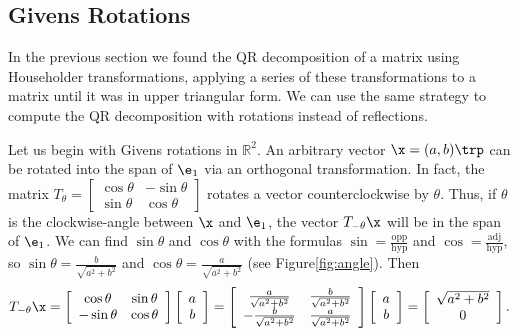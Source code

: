 \subsection*{Givens Rotations} %

In the previous section we found the QR decomposition of a matrix using Householder transformations, applying a series of these transformations to a matrix until it was in upper triangular form.
We can use the same strategy to compute the QR decomposition with rotations instead of reflections.

Let us begin with Givens rotations in $\mathbb{R}^2$.
An arbitrary vector $\x = (a, b)\trp$ can be rotated into the span of $\e_1$ via an orthogonal transformation.
In fact, the matrix $T_{\theta} = \left[\begin{array}{cc}\cos \theta & - \sin \theta \\ \sin \theta & \cos \theta \end{array}\right]$ rotates a vector counterclockwise by $\theta$.
Thus, if $\theta$ is the clockwise-angle between $\x$ and $\e_1$, the vector $T_{-\theta}\x$ will be in the span of $\e_1$.
We can find $\sin \theta$ and $\cos \theta$ with the formulas $\sin = \frac{\text{opp}}{\text{hyp}}$ and $\cos = \frac{\text{adj}}{\text{hyp}}$, so $\sin \theta = \frac{b}{\sqrt{a^2+b^2}}$ and $\cos \theta =  \frac{a}{\sqrt{a^2+b^2}}$ (see Figure\ref{fig:angle}).
Then
\[
T_{-\theta}\x
=
\left[\begin{array}{cc}
\cos\theta  & \sin\theta \\
-\sin\theta & \cos\theta \\
\end{array}\right]
\left[\begin{array}{c} a \\ b \end{array}\right]
=
\left[\begin{array}{cc}
 \frac{a}{\sqrt{a^2+b^2}} & \frac{b}{\sqrt{a^2+b^2}} \\
-\frac{b}{\sqrt{a^2+b^2}} & \frac{a}{\sqrt{a^2+b^2}} \\
\end{array}\right]
\left[\begin{array}{c} a \\ b \end{array}\right]
=
\left[\begin{array}{c} \sqrt{a^2+b^2} \\ 0 \end{array}\right].
\]

